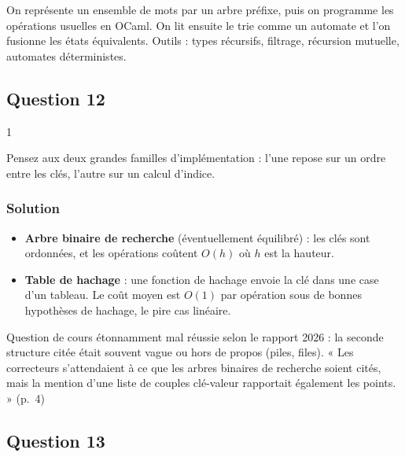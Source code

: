 \documentclass[11pt,a4paper]{article}
\providecommand{\tightlist}{\setlength{\itemsep}{0pt}\setlength{\parskip}{0pt}}
\begin{document}
On représente un ensemble de mots par un arbre préfixe, puis on programme les opérations usuelles en OCaml. On lit ensuite le trie comme un automate et l'on fusionne les états équivalents. Outils : types récursifs, filtrage, récursion mutuelle, automates déterministes.

\hypertarget{question-12}{%
\subsection{Question 12}\label{question-12}}

\begin{indication}{1}

Pensez aux deux grandes familles d'implémentation : l'une repose sur un ordre entre les clés, l'autre sur un calcul d'indice.

\end{indication}

\hypertarget{solution-11}{%
\subsubsection{Solution}\label{solution-11}}

\begin{itemize}
\tightlist
\item
  \textbf{Arbre binaire de recherche} (éventuellement équilibré) : les clés sont ordonnées, et les opérations coûtent \(O(h)\) où \(h\) est la hauteur.
\item
  \textbf{Table de hachage} : une fonction de hachage envoie la clé dans une case d'un tableau. Le coût moyen est \(O(1)\) par opération sous de bonnes hypothèses de hachage, le pire cas linéaire.
\end{itemize}

\begin{jury}

Question de cours étonnamment mal réussie selon le rapport 2026 : la seconde structure citée était souvent vague ou hors de propos (piles, files). « Les correcteurs s'attendaient à ce que les arbres binaires de recherche soient cités, mais la mention d'une liste de couples clé-valeur rapportait également les points. » (p.~4)

\end{jury}

\hypertarget{question-13}{%
\subsection{Question 13}\label{question-13}}
\end{document}
